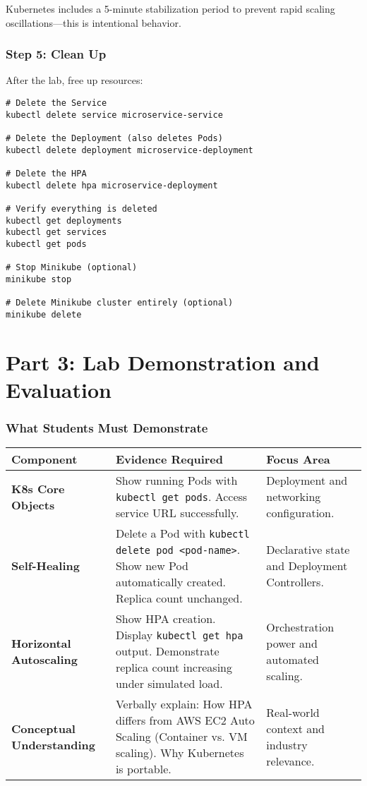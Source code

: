 \documentclass[12pt,a4paper]{article}
\begin{document}
\begin{tipbox}
Kubernetes includes a 5-minute stabilization period to prevent rapid scaling oscillations—this is intentional behavior.
\end{tipbox}

\section{Step 5: Clean Up}

After the lab, free up resources:

\begin{lstlisting}[caption=Clean up resources]
# Delete the Service
kubectl delete service microservice-service

# Delete the Deployment (also deletes Pods)
kubectl delete deployment microservice-deployment

# Delete the HPA
kubectl delete hpa microservice-deployment

# Verify everything is deleted
kubectl get deployments
kubectl get services
kubectl get pods

# Stop Minikube (optional)
minikube stop

# Delete Minikube cluster entirely (optional)
minikube delete
\end{lstlisting}

\newpage

\part{Part 3: Lab Demonstration and Evaluation}

\section{What Students Must Demonstrate}

\begin{table}[H]
\centering
\small
\begin{tabularx}{\textwidth}{|l|X|X|}
\toprule
\textbf{Component} & \textbf{Evidence Required} & \textbf{Focus Area} \\
\midrule
\textbf{K8s Core Objects} &
Show running Pods with \texttt{kubectl get pods}. Access service URL successfully. &
Deployment and networking configuration. \\
\midrule
\textbf{Self-Healing} &
Delete a Pod with \texttt{kubectl delete pod <pod-name>}. Show new Pod automatically created. Replica count unchanged. &
Declarative state and Deployment Controllers. \\
\midrule
\textbf{Horizontal Autoscaling} &
Show HPA creation. Display \texttt{kubectl get hpa} output. Demonstrate replica count increasing under simulated load. &
Orchestration power and automated scaling. \\
\midrule
\textbf{Conceptual Understanding} &
Verbally explain: How HPA differs from AWS EC2 Auto Scaling (Container vs. VM scaling). Why Kubernetes is portable. &
Real-world context and industry relevance. \\
\bottomrule
\end{tabularx}
\end{table}
\end{document}
